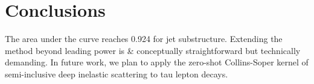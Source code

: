 \section{Conclusions}\label{sec:conclusions}

The area under the curve reaches 0.924 for jet substructure. Extending
the method beyond leading power is & conceptually straightforward but
technically demanding. In future work, we plan to apply the zero-shot
Collins-Soper kernel of semi-inclusive deep inelastic scattering to tau
lepton decays.

